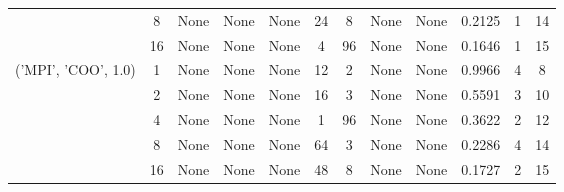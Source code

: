 \begin{tabular}{cccccccccccc}
& 8& None& None& None& 24& 8& None& None& 0.2125& 1& 14\\
& 16& None& None& None& 4& 96& None& None& 0.1646& 1& 15\\
\hline
\multirow{5}{*}{('MPI', 'COO', 1.0)}& 1& None& None& None& 12& 2& None& None& 0.9966& 4& 8\\
& 2& None& None& None& 16& 3& None& None& 0.5591& 3& 10\\
& 4& None& None& None& 1& 96& None& None& 0.3622& 2& 12\\
& 8& None& None& None& 64& 3& None& None& 0.2286& 4& 14\\
& 16& None& None& None& 48& 8& None& None& 0.1727& 2& 15\\
\hline
\end{tabular}
